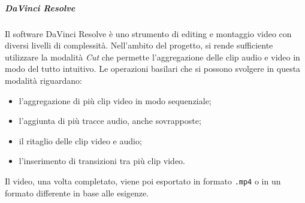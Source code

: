 	\subparagraph{DaVinci Resolve}

	Il software DaVinci Resolve è uno strumento di editing e montaggio video con diversi livelli di complessità. Nell'ambito del progetto, si rende sufficiente utilizzare la modalità \textit{Cut} che permette l'aggregazione delle clip audio e video in modo del tutto intuitivo. Le operazioni basilari che si possono svolgere in questa modalità riguardano:
	\begin{itemize}
		\item l'aggregazione di più clip video in modo sequenziale;
		\item l'aggiunta di più tracce audio, anche sovrapposte;
		\item il ritaglio delle clip video e audio;
		\item l'inserimento di transizioni tra più clip video.
	\end{itemize}
	Il video, una volta completato, viene poi esportato in formato \verb!.mp4! o in un formato differente in base alle esigenze.









